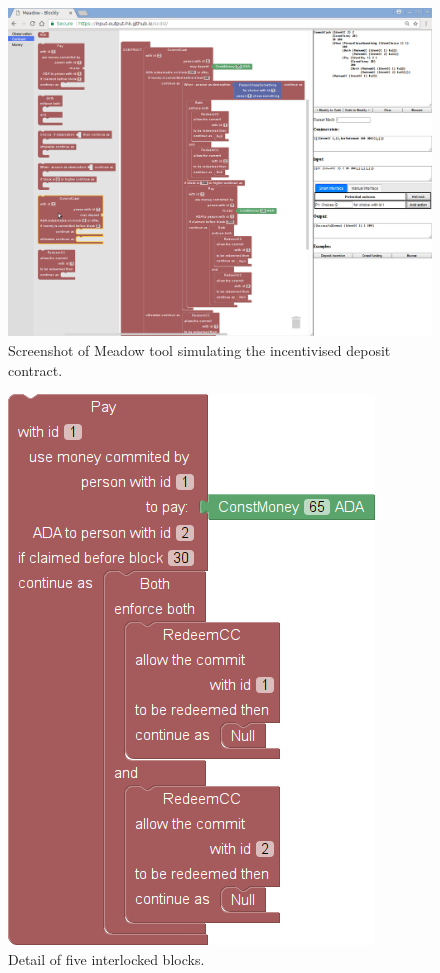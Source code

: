 \documentclass[
      acmsmall
    , screen
  ]{acmart}
\begin{document}
\begin{figure}
\begin{centering}
\includegraphics[width=1\textwidth]{pix/screenshot1}
\par\end{centering}
\caption{\label{fig:full-screenshot-demo}Screenshot of Meadow tool
simulating the incentivised deposit contract.}
\end{figure}

\begin{figure}
\centering{}\includegraphics[scale=0.5]{pix/detail1}\caption{\label{fig:detail-of-block}Detail of five interlocked 
blocks.}
\end{figure}
\end{document}
